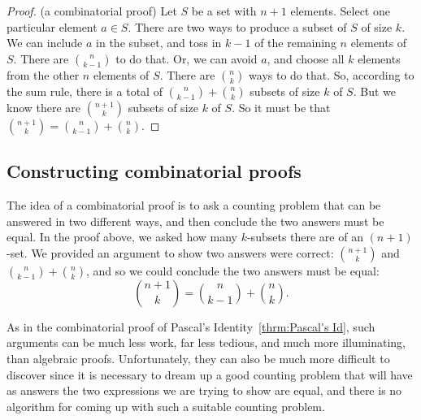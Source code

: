 \begin{proof} (a combinatorial proof) Let $S$ be a set with $n+1$ elements. 
Select one particular element $a\in S$. There are two ways to produce a subset of $S$
of size $k$. We can include $a$ in the subset, and toss in $k-1$ of the remaining
$n$ elements of $S$. There are $\displaystyle {n\choose{k-1}}$ to do that. Or, we can avoid $a$,
and choose all $k$ elements from the other $n$ elements of $S$. There are $\displaystyle{n\choose k}$
ways to do that. So, according to the sum rule, there is a total of
$\displaystyle {n\choose{k-1}}+{n\choose k}$ subsets of size $k$ of $S$. But we know there are
 $\displaystyle{{n+1\choose k}}$ subsets of size $k$ of $S$. So it must be that
 $\displaystyle {n+1\choose k}={n\choose k-1}+{n\choose k}$.
 \end{proof}

\subsection{Constructing combinatorial proofs}
The idea of a combinatorial proof is to ask a counting problem that  can be  answered in
two different ways, and then conclude the two answers must be equal. In the proof above,
we asked how many $k$-subsets there are of an $(n+1)$-set. We provided an argument to
show two answers were correct: $\displaystyle {{n+1}\choose k}$ and $\displaystyle {n\choose{k-1}}+
{n\choose k}$, and so we could conclude the two answers must be equal:
\[
{n+1\choose k}={n\choose k-1}+{n\choose k}.
\]

As in the combinatorial proof of Pascal's Identity~\ref{thrm:Pascal's Id}, 
such arguments can be much less work, far less tedious,
and much more illuminating, than algebraic proofs. Unfortunately, they can also be
much more difficult to discover since it is necessary to dream up a good counting problem that
will have as answers the two expressions we are trying to show are equal, and there
is no algorithm for coming up with such a suitable counting problem.

